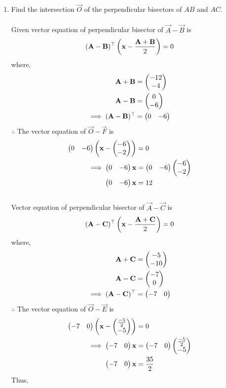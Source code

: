 \documentclass[11pt]{book}
\begin{document}
\begin{enumerate}[label=\thesection.\arabic*.,ref=\thesection.\theenumi]
\item Find the intersection $\vec{O}$ of the perpendicular bisectors of $AB$ and $AC$.\\
\solution\\
Given vector equation of perpendicular bisector of $\vec{A}-\vec{B}$ is
\begin{align}
 (\mathbf{A}-\mathbf{B})^\top  \left( \mathbf{x} - \frac{\mathbf{A}+\mathbf{B}}{2}\right) = 0
\end{align}
where,
\begin{align}
\mathbf{A}+\mathbf{B} &= \begin{pmatrix}-12 \\-4\end{pmatrix}\\
\mathbf{A}-\mathbf{B} &= \begin{pmatrix}0 \\ -6\end{pmatrix}\\
\implies (\mathbf{A}-\mathbf{B})^\top &= \begin{pmatrix}0 & -6\end{pmatrix}
\end{align}
$\therefore $ The vector equation of $\vec{O}-\vec{F}$ is
\begin{align}
\begin{pmatrix}0 & -6\end{pmatrix} \left( \mathbf{x}-\begin{pmatrix}-6 \\ -2\end{pmatrix} \right) &= 0\\
\implies \begin{pmatrix}0 & -6\end{pmatrix}\mathbf{x} &= \begin{pmatrix}0 & -6\end{pmatrix}\begin{pmatrix}-6 \\ -2\end{pmatrix}\\
\begin{pmatrix}0 & -6\end{pmatrix}\mathbf{x} &= 12 
\end{align}\\
Vector equation of perpendicular bisector of $\vec{A}-\vec{C}$ is
\begin{align}
(\mathbf{A}-\mathbf{C})^\top\left( \mathbf{x} - \frac{\mathbf{A}+\mathbf{C}}{2}\right) = 0
\end{align}
where,
\begin{align}
\mathbf{A}+\mathbf{C} &= \begin{pmatrix}-5 \\ -10\end{pmatrix}\\
\mathbf{A}-\mathbf{C} &= \begin{pmatrix} -7\\ 0\end{pmatrix}\\
\implies (\mathbf{A}-\mathbf{C})^\top &= \begin{pmatrix}-7 & 0\end{pmatrix}
\end{align}
$\therefore $ The vector equation of $\vec{O}-\vec{E}$ is
\begin{align}
\begin{pmatrix}-7 & 0\end{pmatrix}\left( \mathbf{x}-\begin{pmatrix}\frac{-5}{2}\\-5\end{pmatrix}\right) &= 0\\
\implies \begin{pmatrix}-7 & 0\end{pmatrix}\mathbf{x} &= \begin{pmatrix}-7 & 0\end{pmatrix}\begin{pmatrix}\frac{-5}{2}\\-5\end{pmatrix}\\
\begin{pmatrix}-7 & 0\end{pmatrix}\mathbf{x} &= \frac{35}{2}
\end{align}
Thus,
\begin{align}

\end{align}
\end{enumerate}
\end{document}
